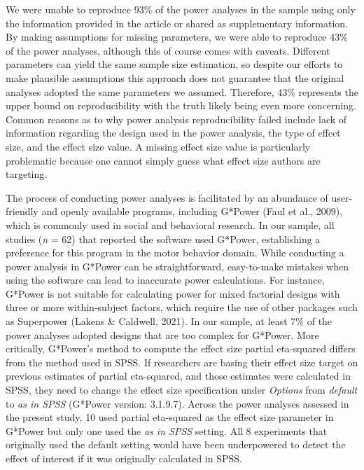 \documentclass[
  man, donotrepeattitle,mask,floatsintext]{apa7}
\begin{document}
We were unable to reproduce 93\% of the power analyses in the sample using only the information provided in the article or shared as supplementary information. By making assumptions for missing parameters, we were able to reproduce 43\% of the power analyses, although this of course comes with caveats. Different parameters can yield the same sample size estimation, so despite our efforts to make plausible assumptions this approach does not guarantee that the original analyses adopted the same parameters we assumed. Therefore, 43\% represents the upper bound on reproducibility with the truth likely being even more concerning. Common reasons as to why power analysis reproducibility failed include lack of information regarding the design used in the power analysis, the type of effect size, and the effect size value. A missing effect size value is particularly problematic because one cannot simply guess what effect size authors are targeting.

The process of conducting power analyses is facilitated by an abundance of user-friendly and openly available programs, including G*Power (Faul et al., 2009), which is commonly used in social and behavioral research. In our sample, all studies (\emph{n} = 62) that reported the software used G*Power, establishing a preference for this program in the motor behavior domain. While conducting a power analysis in G*Power can be straightforward, easy-to-make mistakes when using the software can lead to inaccurate power calculations. For instance, G*Power is not suitable for calculating power for mixed factorial designs with three or more within-subject factors, which require the use of other packages such as Superpower (Lakens \& Caldwell, 2021). In our sample, at least 7\% of the power analyses adopted designs that are too complex for G*Power. More critically, G*Power's method to compute the effect size partial eta-squared differs from the method used in SPSS. If researchers are basing their effect size target on previous estimates of partial eta-squared, and those estimates were calculated in SPSS, they need to change the effect size specification under \emph{Options} from \emph{default} to \emph{as in SPSS} (G*Power version: 3.1.9.7). Across the power analyses assessed in the present study, 10 used partial eta-squared as the effect size parameter in G*Power but only one used the \emph{as in SPSS} setting. All 8 experiments that originally used the default setting would have been underpowered to detect the effect of interest if it was originally calculated in SPSS.
\end{document}
